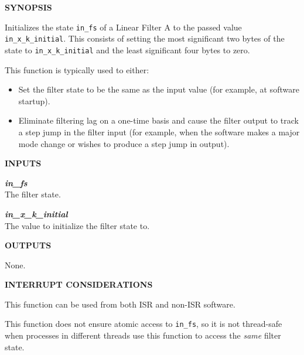 \noindent\textbf{SYNOPSIS}
\begin{list}{}{\setlength{\leftmargin}{0.25in}\setlength{\topsep}{0.0in}}
\item Initializes the state \texttt{in\_fs} of a Linear Filter A
      to the passed value \texttt{in\_x\_k\_initial}.  This consists of
      setting the most significant two bytes of the state to \texttt{in\_x\_k\_initial}
      and the least significant four bytes to zero.
\item This function is typically used to either:
      \begin{itemize}
      \item Set the filter state to be the same as the input value (for example,
            at software startup).
      \item Eliminate filtering lag on a one-time basis and cause the filter output to track a step jump
            in the filter input (for example, when the software makes a major mode change
            or wishes to produce a step jump in output).
      \end{itemize}
\end{list}
\vspace{2.8ex}

\noindent\textbf{INPUTS}
\begin{list}{}{\setlength{\leftmargin}{0.5in}\setlength{\itemindent}{-0.25in}\setlength{\topsep}{0.0in}\setlength{\partopsep}{0.0in}}
\item \emph{\textbf{in\_fs}}\\
      The filter state.
\item \emph{\textbf{in\_x\_k\_initial}}\\
      The value to initialize the filter state to.
\end{list}
\vspace{2.8ex}

\noindent\textbf{OUTPUTS}
\begin{list}{}{\setlength{\leftmargin}{0.25in}\setlength{\topsep}{0.0in}}
\item None.
\end{list}
\vspace{2.8ex}

\noindent\textbf{INTERRUPT CONSIDERATIONS}
\begin{list}{}{\setlength{\leftmargin}{0.25in}\setlength{\topsep}{0.0in}}
\item This function can be used from both ISR and non-ISR software.
\item This function does not ensure atomic access to \texttt{in\_fs}, so it is
      not thread-safe when processes in different threads use this function
      to access the \emph{same} filter state.
\end{list}
\vspace{2.8ex}

